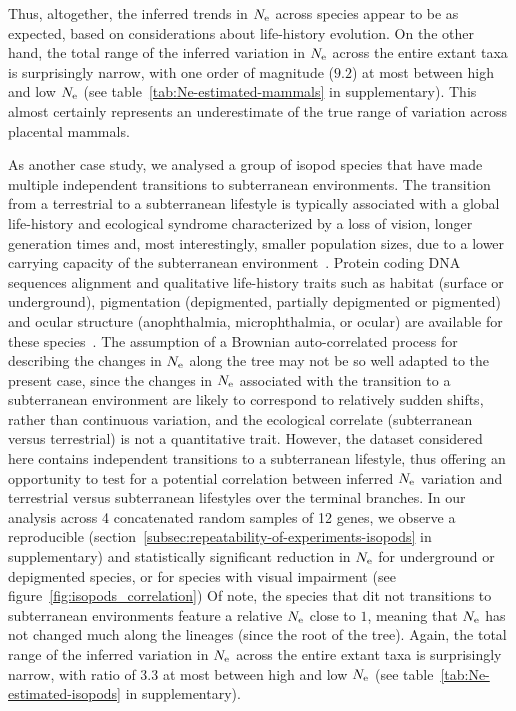 Thus, altogether, the inferred trends in $N_{\text{e}}$ across species appear to be as expected, based on considerations about life-history evolution.
On the other hand, the total range of the inferred variation in $N_{\text{e}}$ across the entire extant taxa is surprisingly narrow, with one order of magnitude ($9.2$) at most between high and low $N_{\text{e}}$ (see table~\ref{tab:Ne-estimated-mammals} in supplementary).
This almost certainly represents an underestimate of the true range of variation across placental mammals.

As another case study, we analysed a group of isopod species that have made multiple independent transitions to subterranean environments.
The transition from a terrestrial to a subterranean lifestyle is typically associated with a global life-history and ecological syndrome characterized by a loss of vision, longer generation times and, most interestingly, smaller population sizes, due to a lower carrying capacity of the subterranean environment~\citep{Capderrey2013}.
Protein coding DNA sequences alignment and qualitative life-history traits such as habitat (surface or underground), pigmentation (depigmented, partially depigmented or pigmented) and ocular structure (anophthalmia, microphthalmia, or ocular) are available for these species~\citep{Eme2013,Saclier2018}.
The assumption of a Brownian auto-correlated process for describing the changes in $N_{\text{e}}$ along the tree may not be so well adapted to the present case, since the changes in $N_{\text{e}}$ associated with the transition to a subterranean environment are likely to correspond to relatively sudden shifts, rather than continuous variation, and the ecological correlate (subterranean versus terrestrial) is not a quantitative trait.
However, the dataset considered here contains independent transitions to a subterranean lifestyle, thus offering an opportunity to test for a potential correlation between inferred $N_{\text{e}}$ variation and terrestrial versus subterranean lifestyles over the terminal branches.
In our analysis across 4 concatenated random samples of 12 genes, we observe a reproducible (section~\ref{subsec:repeatability-of-experiments-isopods} in supplementary) and statistically significant reduction in $N_{\text{e}}$ for underground or depigmented species, or for species with visual impairment (see figure~\ref{fig:isopods_correlation})
Of note, the species that dit not transitions to subterranean environments feature a relative $N_{\text{e}}$ close to $1$, meaning that $N_{\text{e}}$ has not changed much along the lineages (since the root of the tree).
Again, the total range of the inferred variation in $N_{\text{e}}$ across the entire extant taxa is surprisingly narrow, with ratio of $3.3$ at most between high and low $N_{\text{e}}$ (see table~\ref{tab:Ne-estimated-isopods} in supplementary).

